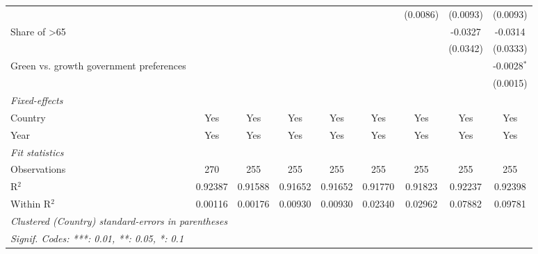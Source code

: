 \begin{table}[htbp]
\begin{tabular}{lcccccccc}
                                                        &          &          &          &          &          & (0.0086) & (0.0093) & (0.0093)\\   
      Share of >65                                      &          &          &          &          &          &          & -0.0327  & -0.0314\\   
                                                        &          &          &          &          &          &          & (0.0342) & (0.0333)\\   
      Green vs. growth government preferences           &          &          &          &          &          &          &          & -0.0028$^{*}$\\   
                                                        &          &          &          &          &          &          &          & (0.0015)\\   
      \midrule
      \emph{Fixed-effects}\\
      Country                                           & Yes      & Yes      & Yes      & Yes      & Yes      & Yes      & Yes      & Yes\\  
      Year                                              & Yes      & Yes      & Yes      & Yes      & Yes      & Yes      & Yes      & Yes\\  
      \midrule
      \emph{Fit statistics}\\
      Observations                                      & 270      & 255      & 255      & 255      & 255      & 255      & 255      & 255\\  
      R$^2$                                             & 0.92387  & 0.91588  & 0.91652  & 0.91652  & 0.91770  & 0.91823  & 0.92237  & 0.92398\\  
      Within R$^2$                                      & 0.00116  & 0.00176  & 0.00930  & 0.00930  & 0.02340  & 0.02962  & 0.07882  & 0.09781\\  
      \midrule \midrule
      \multicolumn{9}{l}{\emph{Clustered (Country) standard-errors in parentheses}}\\
      \multicolumn{9}{l}{\emph{Signif. Codes: ***: 0.01, **: 0.05, *: 0.1}}\\
   \end{tabular}
\end{table}


